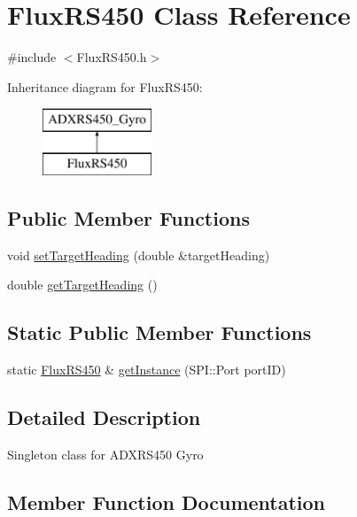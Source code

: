 \hypertarget{classFluxRS450}{}\section{Flux\+R\+S450 Class Reference}
\label{classFluxRS450}


{\ttfamily \#include $<$Flux\+R\+S450.\+h$>$}

Inheritance diagram for Flux\+R\+S450\+:\begin{figure}[H]
\begin{center}
\leavevmode
\includegraphics[height=2.000000cm]{classFluxRS450}
\end{center}
\end{figure}
\subsection*{Public Member Functions}
\begin{DoxyCompactItemize}
\item 
void \hyperlink{classFluxRS450_af3c3eaca528a716ab97106fe62936e39}{set\+Target\+Heading} (double \&target\+Heading)
\item 
double \hyperlink{classFluxRS450_ab2642e1b6a64a18b522636de116bca2c}{get\+Target\+Heading} ()
\end{DoxyCompactItemize}
\subsection*{Static Public Member Functions}
\begin{DoxyCompactItemize}
\item 
static \hyperlink{classFluxRS450}{Flux\+R\+S450} \& \hyperlink{classFluxRS450_a14971d76bad4f15cf16ba8642bd79354}{get\+Instance} (S\+P\+I\+::\+Port port\+ID)
\end{DoxyCompactItemize}


\subsection{Detailed Description}
Singleton class for A\+D\+X\+R\+S450 Gyro 

\subsection{Member Function Documentation}
\mbox{\label{classFluxRS450_a14971d76bad4f15cf16ba8642bd79354}} 
